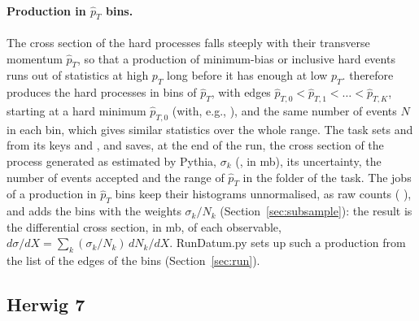 \paragraph{Production in $\hat{p}_T$ bins.}
The cross section of the hard processes falls steeply with their transverse momentum $\hat{p}_T$, so that a
production of minimum-bias or inclusive hard events runs out of statistics at high $p_T$ long before it has enough at
low $p_T$. \Datum{} therefore produces the hard processes in bins of $\hat{p}_T$, with edges
$\hat{p}_{T,0} < \hat{p}_{T,1} < \dots < \hat{p}_{T,K}$, starting at a hard minimum $\hat{p}_{T,0}$ (with, e.g.,
), and the same number of events $N$ in each bin, which gives similar statistics over the whole
range. The task sets  and  from its keys  and
, and saves, at the end of the run, the cross section of the process generated as estimated by
Pythia, $\sigma_k$ (, in mb), its uncertainty, the number of events accepted and the range of
$\hat{p}_T$ in the folder of the task. The jobs of a production in $\hat{p}_T$ bins keep their histograms unnormalised,
as raw counts ( ), and  adds the bins with the weights
$\sigma_k/N_k$ (Section~\ref{sec:subsample}): the result is the differential cross section, in mb, of each observable,
$d\sigma/dX = \sum_k (\sigma_k/N_k)\, dN_k/dX$. RunDatum.py sets up such a production from the list of the edges of
the bins (Section~\ref{sec:run}).

\subsection{Herwig 7}
\label{sec:herwig}

